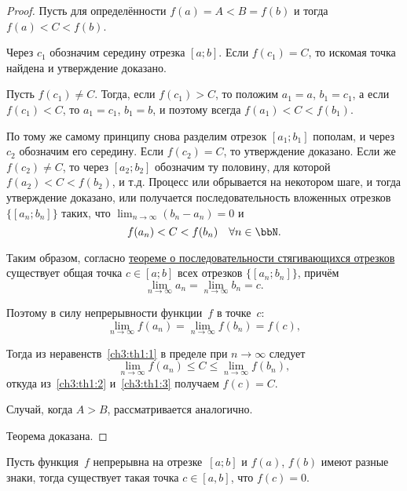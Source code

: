 \begin{proof}
Пусть для определённости $f(a)=A < B = f(b)$ и тогда $f(a) < C < f(b)$.

Через $c_1$ обозначим середину отрезка $[a;b]$. Если $f(c_1) = C$, то искомая точка найдена и утверждение доказано.

Пусть $f(c_1)\ne C$. Тогда, если $f(c_1) > C$, то положим $a_1 = a$, $b_1 = c_1$, а если $f(c_1) < C$, то $a_1 = c_1$, $b_1 = b$, и поэтому всегда $f(a_1)<C<f(b_1)$.

По тому же самому принципу снова разделим отрезок $[a_1; b_1]$ пополам, и через $c_2$ обозначим его середину. Если $f(c_2) = C$, то утверждение доказано. Если же $f(c_2) \ne C$, то через $[a_2;b_2]$ обозначим ту половину, для которой $f(a_2) < C < f(b_2)$, и т.д. Процесс или обрывается на некотором шаге, и тогда утверждение доказано, или получается последовательность вложенных отрезков $\{[a_n;b_n]\}$ таких, что $\lim_{n \to \infty}\limits(b_n-a_n)=0$ и
\begin{equation}\label{ch3:th1:1}
f(a_n)<C<f(b_n)\quad \forall n\in \bbN.
\end{equation}

Таким образом, согласно  \hyperref[th:ch1:poslstyag]{теореме о последовательности стягивающихся отрезков} существует общая точка $c \in [a;b]$ всех отрезков $\{[a_n;b_n]\}$, причём 
$$
\lim_{n \to \infty}a_n = \lim_{n \to \infty}b_n = c.
$$

Поэтому в силу непрерывности функции~$f$ в точке~$c$:
\begin{equation}\label{ch3:th1:2}
\lim_{n \to \infty}f(a_n) = \lim_{n \to \infty}f(b_n) = f(c),
\end{equation}

Тогда из неравенств~\eqref{ch3:th1:1} в пределе при $n \to \infty$ следует 
\begin{equation}\label{ch3:th1:3}
\lim_{n \to \infty}f(a_n) \le C \le \lim_{n \to \infty}f(b_n),
\end{equation}
откуда из~\eqref{ch3:th1:2} и~\eqref{ch3:th1:3} получаем $f(c)=C$.

Случай, когда $A > B$, рассматривается аналогично.
 
Теорема доказана.
\end{proof}

\begin{cons}
Пусть функция~$f$ непрерывна на отрезке~$[a;b]$ и $f(a)$, $f(b)$ имеют разные знаки, тогда существует такая точка $c \in [a,b]$, что $f(c)=0$.
\end{cons}

